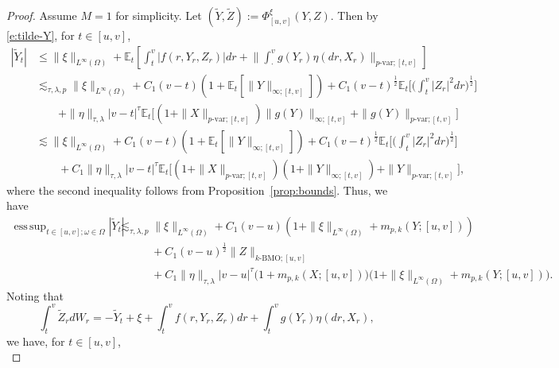 \documentclass[11pt,reqno]{amsart}
\DeclareMathOperator*{\esssup}{ess\,sup}
\numberwithin{equation}{section}
\begin{document}
\begin{proof}
Assume $M=1$ for simplicity. Let $(\tilde{Y},\tilde{Z}) := \Phi^{\xi}_{[u,v]}(Y,Z)$. Then by \eqref{e:tilde-Y}, for $t\in[u,v]$,
\begin{equation}\label{e:|tilde Y|}
\begin{aligned}
|\tilde{Y}_{t}| &\le \|\xi\|_{L^{\infty}(\Omega)} + \mathbb{E}_{t}\left[\int_{t}^{v}|f(r,Y_{r},Z_{r})|dr + \Big\|\int_{\cdot}^{v}g(Y_{r})\eta(dr,X_{r})\Big\|_{p\text{-var};[t,v]}\right]\\
&\lesssim_{\tau,\lambda,p} \|\xi\|_{L^{\infty}(\Omega)} + C_{1}(v-t)\left(1+\mathbb{E}_{t}\left[\|Y\|_{\infty;[t,v]}\right]\right) + C_{1}(v-t)^{\frac{1}{2}}\mathbb{E}_{t}\Big[\Big(\int_{t}^{v}|Z_{r}|^{2}dr \Big)^{\frac{1}{2}}\Big]\\
&\quad\quad + \|\eta\|_{\tau,\lambda}|v - t|^{\tau} \mathbb{E}_{t}\Big[\left(1+\|X\|_{p\text{-var};[t,v]}\right)\|g(Y)\|_{\infty;[t,v]} +\|g(Y)\|_{p\text{-var};[t,v]}\Big] \\
&\lesssim \|\xi\|_{L^{\infty}(\Omega)} + C_{1}(v-t)\left(1+\mathbb{E}_{t}\left[\|Y\|_{\infty;[t,v]}\right]\right) + C_{1}(v-t)^{\frac{1}{2}}\mathbb{E}_{t}\Big[\Big(\int_{t}^{v}|Z_{r}|^{2}dr \Big)^{\frac{1}{2}}\Big]\\
&\quad\quad + C_{1}\|\eta\|_{\tau,\lambda}|v - t|^{\tau} \mathbb{E}_{t}\Big[\left(1+\|X\|_{p\text{-var};[t,v]}\right)\left(1+\|Y\|_{\infty;[t,v]}\right)+\|Y\|_{p\text{-var};[t,v]}\Big],
\end{aligned}
\end{equation}
where the second inequality follows from Proposition~\ref{prop:bounds}. Thus,  we have
\begin{align}\nonumber
\esssup_{t\in[u,v];\omega\in\Omega}|\tilde{Y}_{t}|
&  \lesssim_{\tau,\lambda,p} \|\xi\|_{L^{\infty}(\Omega)} + C_{1}(v-u) (1+\|\xi\|_{L^{\infty}(\Omega)}+m_{p,k}(Y;[u,v]) ) \\ \label{e:tilde Y}     
&\quad\quad\quad + C_{1}(v-u)^{\frac{1}{2}}\|Z\|_{k\text{-BMO};[u,v]} \\
\nonumber&\quad\quad\quad + C_{1}\|\eta\|_{\tau,\lambda}|v-u|^{\tau}\big(1+m_{p,k}(X;[u,v])\big)   \big(1+\|\xi\|_{L^{\infty}(\Omega)}+m_{p, k}(Y;[u,v])\big).
\end{align}
Noting that 			
\begin{equation*}
\int_{t}^{v}\tilde{Z}_{r}dW_{r}= - \tilde{Y}_{t} + \xi + \int_{t}^{v}f(r,Y_{r},Z_{r}) dr + \int_{t}^{v} g(Y_{r})\eta(dr,X_{r}),
\end{equation*}
we have, for $t\in[u,v]$, 
\begin{equation}\label{e:estimate-Z-BMO}

\end{equation}
\end{proof}
\end{document}
